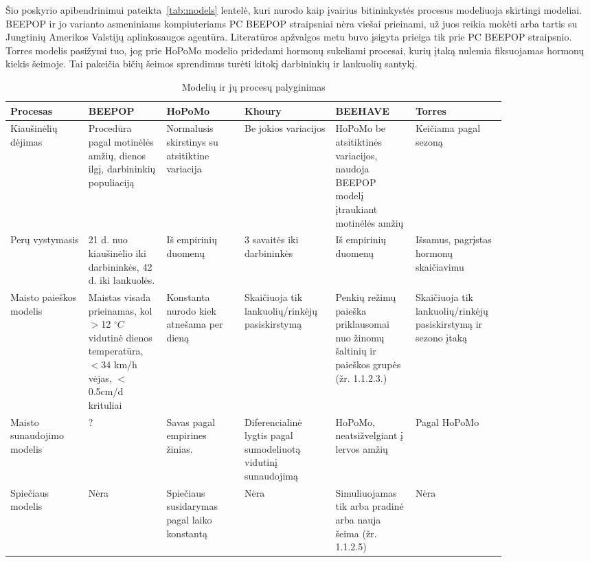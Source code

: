 \documentclass{VUMIFPSmagistrinis}
\begin{document}
Šio poskyrio apibendrinimui pateikta~\ref{tab:models} lentelė, kuri nurodo kaip įvairius bitininkystės procesus modeliuoja skirtingi modeliai. BEEPOP ir jo varianto asmeniniams kompiuteriams PC BEEPOP \cite{BDO91} straipsniai nėra viešai prieinami, už juos reikia mokėti arba tartis su Jungtinių Amerikos Valstijų aplinkosaugos agentūra. Literatūros apžvalgos metu buvo įsigyta prieiga tik prie PC BEEPOP straipsnio.
Torres \cite{TRR15} modelis pasižymi tuo, jog prie HoPoMo modelio pridedami hormonų sukeliami procesai, kurių įtaką nulemia fiksuojamas hormonų kiekis šeimoje. Tai pakeičia bičių šeimos sprendimus turėti kitokį darbininkių ir lankuolių santykį.



\begin{table} [H]
\small
\centering
\caption{Modelių ir jų procesų palyginimas}
\begin{tabular}{p{0.14\linewidth}|p{0.14\linewidth}|p{0.14\linewidth}|p{0.14\linewidth}|p{0.14\linewidth}|p{0.14\linewidth}}
Procesas & BEEPOP & HoPoMo & Khoury & BEEHAVE & Torres \\
\hline
Kiau\-ši\-nė\-lių dė\-ji\-mas & Procedūra pagal motinėlės amžių, dienos ilgį, darbininkių populiaciją & Normalusis skirstinys su at\-si\-tik\-ti\-ne variacija & Be jokios variacijos & HoPoMo be at\-si\-tik\-ti\-nės variacijos, naudoja BEEPOP modelį įtraukiant motinėlės amžių & Keičiama pagal sezoną \\
\hline
Perų vys\-ty\-ma\-sis & 21 d. nuo kiau\-ši\-nė\-lio iki darbininkės, 42 d. iki lankuolės. & Iš empirinių duomenų \cite{FuS68, FuO77} & 3 savaitės iki darbininkės & Iš empirinių duomenų \cite{FuS68, FuO77}& Išsamus, pagrįstas hormonų skaičiavimu \\
 \hline
Maisto paieškos modelis & Maistas visada prieinamas, kol $>$12 $^\circ C$  vidutinė dienos tem\-pe\-ra\-tū\-ra, $<$34 km/h vėjas, $<$0.5cm/d krituliai & Konstanta nurodo kiek atnešama per dieną & Skaičiuoja tik lankuolių/rinkėjų pasiskirstymą & Penkių režimų paieška priklausomai nuo žinomų šaltinių ir paieškos grupės (žr. 1.1.2.3.) & Skaičiuoja tik lankuolių/rinkėjų pasiskirstymą ir sezono įtaką \\
 \hline
Maisto su\-nau\-do\-ji\-mo mo\-de\-lis & ? & Savas pagal em\-pi\-ri\-nes ži\-nias. & Di\-fe\-ren\-cia\-li\-nė lygtis pa\-gal su\-mo\-de\-liuo\-tą vi\-du\-ti\-nį su\-nau\-do\-ji\-mą & HoPoMo, neatsižvelgiant į lervos amžių & Pagal HoPoMo \\
\hline
Spiečiaus modelis & Nėra & Spiečiaus susidarymas pagal laiko konstantą & Nėra & Simuliuojamas tik arba pradinė arba nauja šeima (žr. 1.1.2.5) & Nėra \\

\end{tabular}
\end{table}
\end{document}
